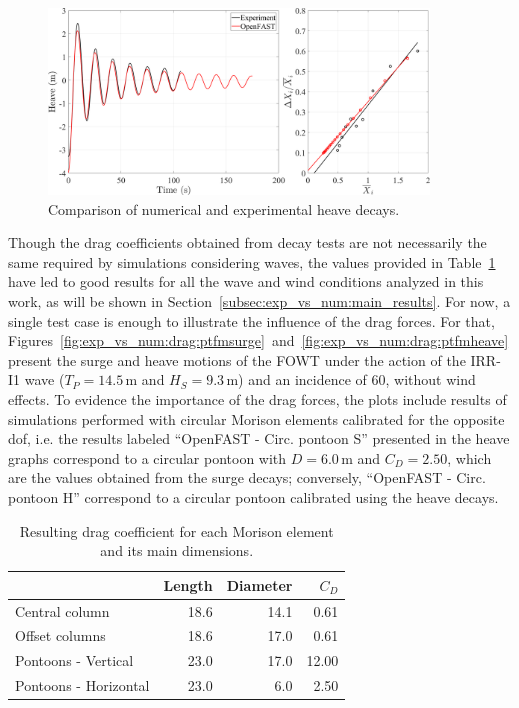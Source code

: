 \begin{figure}[!hbtp]
	\centering
	\includegraphics[width=0.9\textwidth]{./figures/heave_decay_drag_pontoon.png}	
	\caption{Comparison of numerical and experimental heave decays.} \label{fig:exp_vs_num:drag:heave_decay}
\end{figure}

Though the drag coefficients obtained from decay tests are not necessarily the same required by simulations considering waves, the values provided in Table~\ref{tab:exp_vs_num:drag:drag_coeffs} have led to good results for all the wave and wind conditions analyzed in this work, as will be shown in Section~\ref{subsec:exp_vs_num:main_results}. For now, a single test case is enough to illustrate the influence of the drag forces. For that, Figures~\ref{fig:exp_vs_num:drag:ptfmsurge}~and~\ref{fig:exp_vs_num:drag:ptfmheave} present the surge and heave motions of the FOWT under the action of the IRR-I1 wave ($T_P=14.5\,\text{m}$ and $H_S=9.3\,\text{m}$) and an incidence of 60\textdegree{}, without wind effects. To evidence the importance of the drag forces, the plots include results of simulations performed with circular Morison elements calibrated for the opposite dof, i.e. the results labeled \enquote{OpenFAST - Circ. pontoon S} presented in the heave graphs correspond to a circular pontoon with $D=6.0\,\text{m}$ and $C_D=2.50$, which are the values obtained from the surge decays; conversely, \enquote{OpenFAST - Circ. pontoon H} correspond to a circular pontoon calibrated using the heave decays.

\begin{table}[!hbtp]
	\caption{Resulting drag coefficient for each Morison element and its main dimensions.}\label{tab:exp_vs_num:drag:drag_coeffs}
	\begin{tabular}{lrrr}
		\toprule
		& Length & Diameter & $C_D$ \\
		\midrule
		Central column & 18.6 & 14.1 & 0.61 \\
		Offset columns & 18.6 & 17.0 & 0.61 \\
		Pontoons - Vertical & 23.0 & 17.0 & 12.00 \\
		Pontoons - Horizontal & 23.0 & 6.0 & 2.50 \\
		\bottomrule
\end{tabular}
\end{table}

